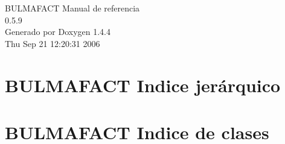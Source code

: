 \documentclass[a4paper]{book}
\begin{document}
\begin{titlepage}
\vspace*{7cm}
\begin{center}
{\Large BULMAFACT Manual de referencia\\[1ex]\large 0.5.9 }\\
\vspace*{1cm}
{\large Generado por Doxygen 1.4.4}\\
\vspace*{0.5cm}
{\small Thu Sep 21 12:20:31 2006}\\
\end{center}
\end{titlepage}
\clearemptydoublepage
{}
\tableofcontents
\clearemptydoublepage
{}
\chapter{BULMAFACT Indice jer\'{a}rquico}

\chapter{BULMAFACT Indice de clases}

\end{document}
